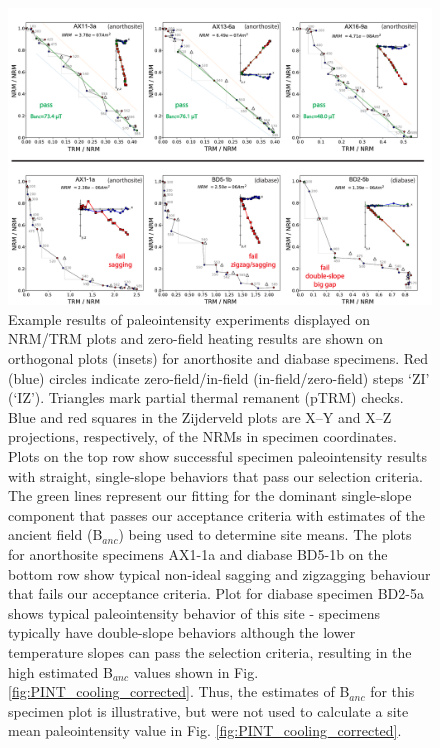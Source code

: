 \documentclass[9pt,twocolumn,twoside,lineno]{pnas-new}
\begin{document}
\begin{figure}
\noindent\includegraphics[width=17.8cm]{IZZI_examples.pdf}
\centering
\caption{\footnotesize{Example results of paleointensity experiments displayed on NRM/TRM plots and zero-field heating results are shown on orthogonal plots (insets) for anorthosite and diabase specimens. Red (blue) circles indicate zero-field/in-field (in-field/zero-field) steps `ZI’ (`IZ’). Triangles mark partial thermal remanent (pTRM) checks. Blue and red squares in the Zijderveld plots are X–Y and X–Z projections, respectively, of the NRMs in specimen coordinates. Plots on the top row show successful specimen paleointensity results with straight, single-slope behaviors that pass our selection criteria. The green lines represent our fitting for the dominant single-slope component that passes our acceptance criteria with estimates of the ancient field (B$_{anc}$) being used to determine site means. The plots for anorthosite specimens AX1-1a and diabase BD5-1b on the bottom row show typical non-ideal sagging and zigzagging behaviour that fails our acceptance criteria. Plot for diabase specimen BD2-5a shows typical paleointensity behavior of this site - specimens typically have double-slope behaviors although the lower temperature slopes can pass the selection criteria, resulting in the high estimated B$_{anc}$ values shown in Fig. \ref{fig:PINT_cooling_corrected}. Thus, the estimates of B$_{anc}$ for this specimen plot is illustrative, but were not used to calculate a site mean paleointensity value in Fig. \ref{fig:PINT_cooling_corrected}.}}
\label{fig:IZZI_examples}
\end{figure}
\end{document}
